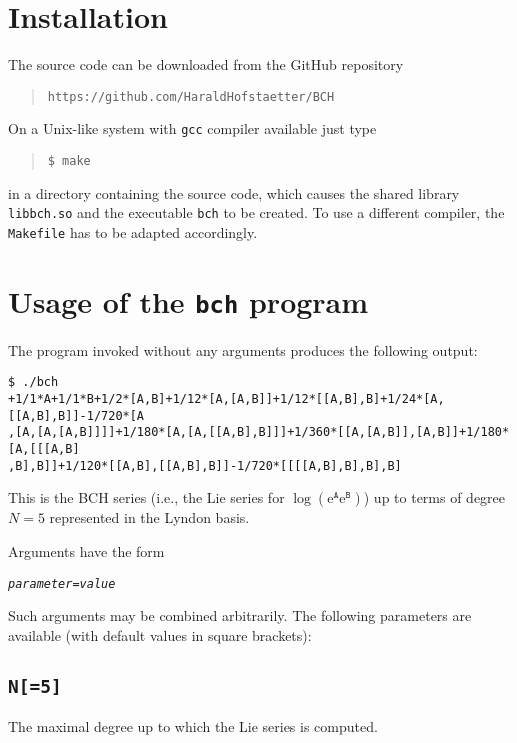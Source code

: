 \documentclass[11pt,a4paper]{article}
\newcommand{\ee}{\mathrm{e}}
\renewcommand{\AA}{\mathtt{A}}
\newcommand{\BB}{\mathtt{B}}
\begin{document}
\section{Installation}
The source code  can be downloaded from the GitHub repository
\begin{quote}
{\tt https://github.com/HaraldHofstaetter/BCH}
\end{quote}
On a Unix-like system with \verb|gcc| compiler available just type
\begin{quote}
\begin{BVerbatim}
$ make
\end{BVerbatim} 
\end{quote}
in a directory containing the source code, which causes 
the shared library \verb|libbch.so| and the executable \verb|bch|
to be created.
To use a different compiler, the \verb|Makefile| has to be adapted accordingly.


\section{Usage of the {\tt bch} program}
The program invoked without any arguments produces the following output:

\medskip

{\small\begin{BVerbatim}
$ ./bch
+1/1*A+1/1*B+1/2*[A,B]+1/12*[A,[A,B]]+1/12*[[A,B],B]+1/24*[A,[[A,B],B]]-1/720*[A
,[A,[A,[A,B]]]]+1/180*[A,[A,[[A,B],B]]]+1/360*[[A,[A,B]],[A,B]]+1/180*[A,[[[A,B]
,B],B]]+1/120*[[A,B],[[A,B],B]]-1/720*[[[[A,B],B],B],B]
\end{BVerbatim}
}

\medskip

\noindent This is the BCH series (i.e., the Lie series for $\log(\ee^{\AA}\ee^{\BB})$)
up to terms of degree $N=5$ represented in the Lyndon basis.

Arguments have the form
\begin{center}
{\tt\em parameter=value}
\end{center}
Such arguments may be combined arbitrarily. The following parameters are available 
(with default values in square brackets):

\subsection*{{\tt N[=5]}}
The maximal degree up to which the Lie series is computed.
\end{document}
